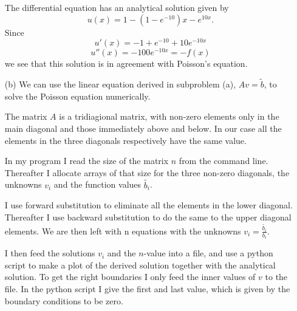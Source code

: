 \documentclass[a4paper,12pt, english]{article}
\begin{document}
\begin{enumerate}
The differential equation has an analytical solution given by $$u(x) = 1 - (1-e^{-10})x - e^{10x}. $$
Since
$$u'(x) = -1 + e^{-10} + 10e^{-10x} $$
$$u''(x) = -100e^{-10x} = - f(x)$$
we see that this solution is in agreement with Poisson's equation.

\item[(b)] 
We can use the linear equation derived in subproblem (a), $Av = \tilde{b}$, to solve the Poisson equation numerically. 

The matrix $A$ is a tridiagional matrix, with non-zero elements only in the main diagonal and those immediately above and below. In our case all the elements in the three diagonals respectively have the same value. 

In my program I read the size of the matrix $n$ from the command line. Thereafter I allocate arrays of that size for the three non-zero diagonals, the unknowns $v_{i}$ and the function values $\tilde{b_{i}}$.

I use forward substitution to eliminate all the elements in the lower diagonal. Thereafter I use backward substitution to do the same to the upper diagonal elements. We are then left with n equations with the 		unknowns $v_{i} = \frac{\tilde{b_{i}}}{b_{i}}$.

I then feed the solutions $v_{i}$ and the $n$-value into a file, and use a python script to make a plot of the derived solution together with the analytical solution. To get the right boundaries I only feed the inner values of $v$ to the file. In the python script I give the first and last value, which is given by the boundary conditions to be zero. 



\end{enumerate}
\end{document}
